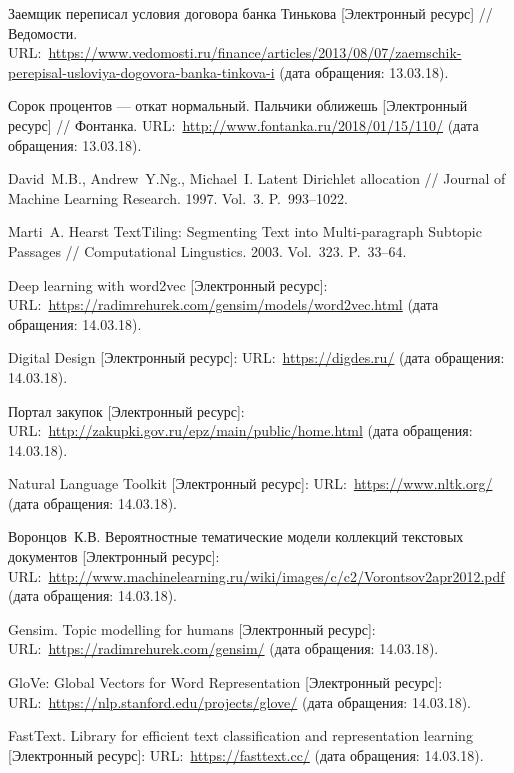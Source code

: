 \documentclass[12pt]{article}
\begin{document}
\begin{thebibliography}{99}
\vspace{-7pt}

 Заемщик переписал условия договора банка Тинькова [Электронный ресурс] // Ведомости.  URL:~\url{https://www.vedomosti.ru/finance/articles/2013/08/07/zaemschik-perepisal-usloviya-dogovora-banka-tinkova-i} (дата обращения: 13.03.18).

 Сорок процентов --- откат нормальный. Пальчики оближешь [Электронный ресурс] // Фонтанка. URL:~\url{http://www.fontanka.ru/2018/01/15/110/} (дата обращения: 13.03.18).

 David~M.\:B., Andrew~Y.\:Ng., Michael~I. Latent Dirichlet allocation // Journal of Machine Learning Research. 1997. Vol.~3. P.~993--1022.

 Marti~A. Hearst TextTiling: Segmenting Text into Multi-paragraph Subtopic Passages // Computational Lingustics. 2003. Vol.~323. P.~33--64.

 Deep learning with word2vec [Электронный ресурс]: URL:~\url{https://radimrehurek.com/gensim/models/word2vec.html} (дата обращения: 14.03.18).

  Digital Design [Электронный ресурс]: URL:~\url{https://digdes.ru/} (дата обращения: 14.03.18).

 Портал закупок [Электронный ресурс]: URL:~\url{http://zakupki.gov.ru/epz/main/public/home.html} (дата обращения: 14.03.18).

 Natural Language Toolkit [Электронный ресурс]: URL:~\url{https://www.nltk.org/} (дата обращения: 14.03.18).

 Воронцов~К.\:В. Вероятностные тематические модели коллекций текстовых документов [Электронный ресурс]: URL:~\url{http://www.machinelearning.ru/wiki/images/c/c2/Vorontsov2apr2012.pdf} (дата обращения: 14.03.18).

  Gensim. Topic modelling for humans [Электронный ресурс]: URL:~\url{https://radimrehurek.com/gensim/} (дата обращения: 14.03.18).

  GloVe: Global Vectors for Word Representation [Электронный ресурс]: URL:~\url{https://nlp.stanford.edu/projects/glove/} (дата обращения: 14.03.18).

  FastText. Library for efficient text classification and representation learning [Электронный ресурс]: URL:~\url{https://fasttext.cc/} (дата обращения: 14.03.18).


\end{thebibliography}
\end{document}
